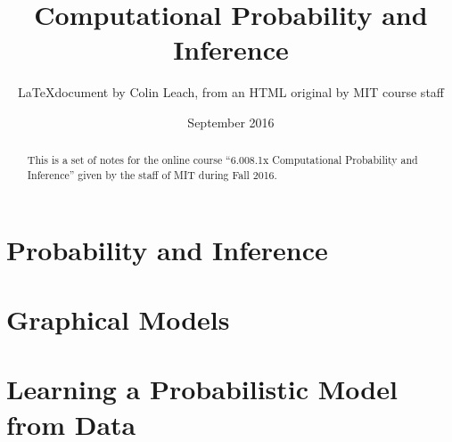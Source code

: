 



\title{Computational Probability and Inference}
\author{\LaTeX document by Colin Leach, from an HTML original by MIT course staff\\}
\date{September 2016}
\maketitle

\begin{abstract}
This is a set of notes for the online course ``6.008.1x Computational Probability and Inference'' given by the staff of MIT during Fall 2016.
\end{abstract}

\tableofcontents

\setlength{\parindent}{0pt}
\setlength{\parskip}{0.5em}
\setlength{\intextsep}{2mm}

\chapter{Probability and Inference}









\chapter{Graphical Models}


\chapter{Learning a Probabilistic Model from Data}



